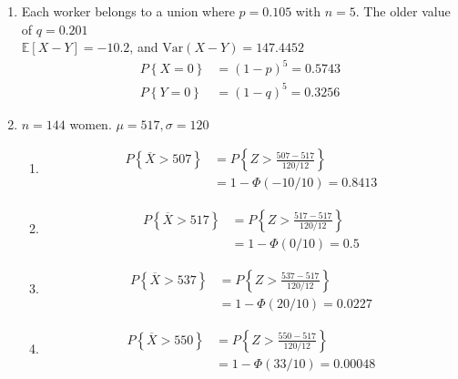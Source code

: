 \begin{enumerate}
\begin{enumerate}
		\end{enumerate}
	
	
	\item Each worker belongs to a union where $ p = 0.105 $ with $ n = 5 $. The older value of $ q = 0.201 $\\
	$ \mathbb{E}[X-Y] = -10.2 $, and $\mathrm{Var}(X-Y) = 147.4452$\\
	
		\begin{align}
			P \left\{X = 0 \right\} &= (1-p)^5 = 0.5743 \\
			P \left\{Y = 0 \right\} &= (1-q)^5 = 0.3256
		\end{align}
	
	
	\item $ n = 144 $ women. $ \mu = 517, \sigma = 120 $ \\
	
		\begin{enumerate}
			\item 			
			\begin{align}
				P \left\{\overline{X} > 507 \right\} &= P \left\{Z > \frac{507 - 517}{120/12} \right\} \nonumber \\
				&= 1 - \Phi (-10/10) = 0.8413
			\end{align}
			
			\item 			
			\begin{align}
				P \left\{\overline{X} > 517 \right\} &= P \left\{Z > \frac{517 - 517}{120/12} \right\} \nonumber \\
				&= 1 - \Phi (0/10) = 0.5
			\end{align}
			
			
			\item 			
			\begin{align}
				P \left\{\overline{X} > 537 \right\} &= P \left\{Z > \frac{537 - 517}{120/12} \right\} \nonumber \\
				&= 1 - \Phi (20/10) = 0.0227
			\end{align}
			
			\item 			
			\begin{align}
				P \left\{\overline{X} > 550 \right\} &= P \left\{Z > \frac{550 - 517}{120/12} \right\} \nonumber \\
				&= 1 - \Phi (33/10) = 0.00048
			\end{align}
			
		\end{enumerate}
	

\end{enumerate}
